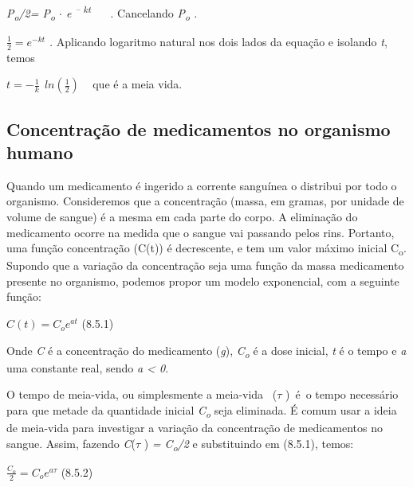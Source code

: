 \textit{ P\textsubscript{o}/2= P\textsubscript{o} $ \cdot $  e \textsuperscript{– kt}}{\fontsize{14pt}{16.8pt}\selectfont \textit{~ ~ . }Cancelando\textit{ P\textsubscript{o} .}}

\( \frac{1}{2}=e^{-kt} \) {\fontsize{14pt}{16.8pt}\selectfont \textit{. }Aplicando logaritmo natural nos dois lados da equação e isolando \textit{t}, temos\textit{ }}

{\fontsize{14pt}{16.8pt}\selectfont \textit{ }}

\( t=-\frac{1}{k}~~ ln  \left( \frac{ 1}{2} \right)  \) {\fontsize{14pt}{16.8pt}\selectfont ~ que é a meia vida.}

\subsection{Concentração de medicamentos no organismo humano}

Quando um medicamento é ingerido a corrente sanguínea o distribui por todo o organismo. Consideremos que a concentração (massa, em gramas, por unidade de volume de sangue) é a mesma em cada parte do corpo. A eliminação do medicamento ocorre na medida que o sangue vai passando pelos rins. Portanto, uma função concentração (C(t)) é decrescente, e tem um valor máximo inicial C\textsubscript{o}. Supondo que a variação da concentração seja uma função da massa medicamento presente no organismo, podemos propor um modelo exponencial, com a seguinte função:

\begin{FlushRight}
 \( C \left( t \right) =C_{o}e^{at} \) \quad \quad \quad \quad \quad \quad (8.5.1)
\end{FlushRight}

Onde \textit{C} é a concentração do medicamento (\textit{g}), \textit{C\textsubscript{o}} é a dose inicial, \textit{t} é o tempo e \textit{a} uma constante real, sendo \textit{a < 0}.

O tempo de meia-vida, ou simplesmente a meia-vida~ ($ \tau$ )~é~o tempo necessário para que metade da quantidade inicial   \textit{C\textsubscript{o}} seja eliminada. É comum usar a ideia de meia-vida para investigar a variação da concentração de medicamentos no sangue. Assim, fazendo \textit{C}($ \tau$ ) \textit{= C\textsubscript{o}/2} e substituindo em (8.5.1), temos:

\begin{FlushRight}
 \( \frac{C_{o}}{2}=C_{o}e^{a \tau} \) \quad \quad \quad \quad \quad \quad (8.5.2)
\end{FlushRight}

